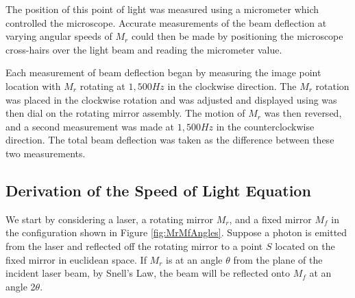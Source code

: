 \documentclass[twocolumn]{article}
\begin{document}
		The position of this point of light was measured using a micrometer which controlled the microscope.
		Accurate measurements of the beam deflection at varying angular speeds of $M_r$ could then be made by positioning the microscope cross-hairs over the light beam and reading the micrometer value.
		
		Each measurement of beam deflection began by measuring the image point location with $M_r$ rotating at $1,500Hz$ in the clockwise direction.
		The $M_r$ rotation was placed in the clockwise rotation and was adjusted and displayed using was then dial on the rotating mirror assembly. 
		The motion of $M_r$ was then reversed, and a second measurement was made at $1,500Hz$ in the counterclockwise direction.
		The total beam deflection was taken as the difference between these two measurements.
			
	\subsection{Derivation of the Speed of Light Equation}
	\label{subsec:Derivation}
	We start by considering a laser, a rotating mirror $M_r$, and a fixed mirror $M_f$ in the configuration shown in Figure \ref{fig:MrMfAngles}. 
	Suppose a photon is emitted from the laser and reflected off the rotating mirror to a point $S$ located on the fixed mirror in euclidean space. 
	If $M_r$ is at an angle $\theta$ from the plane of the incident laser beam, by Snell's Law, the beam will be reflected onto $M_f$ at an angle 2$\theta$.
	
\end{document}
